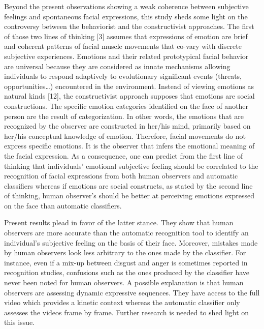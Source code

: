 \documentclass[conference,final,]{IEEEtran}
\begin{document}
Beyond the present observations showing a weak coherence between
subjective feelings and spontaneous facial expressions, this study sheds
some light on the controversy between the behaviorist and the
constructivist approaches. The first of those two lines of thinking
{[}3{]} assumes that expressions of emotion are brief and coherent
patterns of facial muscle movements that co-vary with discrete
subjective experiences. Emotions and their related prototypical facial
behavior are universal because they are considered as innate mechanisms
allowing individuals to respond adaptively to evolutionary significant
events (threats, opportunities\ldots{}) encountered in the environment.
Instead of viewing emotions as natural kinds {[}12{]}, the
constructivist approach supposes that emotions are social constructions.
The specific emotion categories identified on the face of another person
are the result of categorization. In other words, the emotions that are
recognized by the observer are constructed in her/his mind, primarily
based on her/his conceptual knowledge of emotion. Therefore, facial
movements do not express specific emotions. It is the observer that
infers the emotional meaning of the facial expression. As a consequence,
one can predict from the first line of thinking that individuals'
emotional subjective feeling should be correlated to the recognition of
facial expressions from both human observers and automatic classifiers
whereas if emotions are social constructs, as stated by the second line
of thinking, human observer's should be better at perceiving emotions
expressed on the face than automatic classifiers.

Present results plead in favor of the latter stance. They show that
human observers are more accurate than the automatic recognition tool to
identify an individual's subjective feeling on the basis of their face.
Moreover, mistakes made by human observers look less arbitrary to the
ones made by the classifier. For instance, even if a mix-up between
disgust and anger is sometimes reported in recognition studies,
confusions such as the ones produced by the classifier have never been
noted for human observers. A possible explanation is that human
observers are assessing dynamic expressive sequences. They have access
to the full video which provides a kinetic context whereas the automatic
classifier only assesses the videos frame by frame. Further research is
needed to shed light on this issue.
\end{document}
